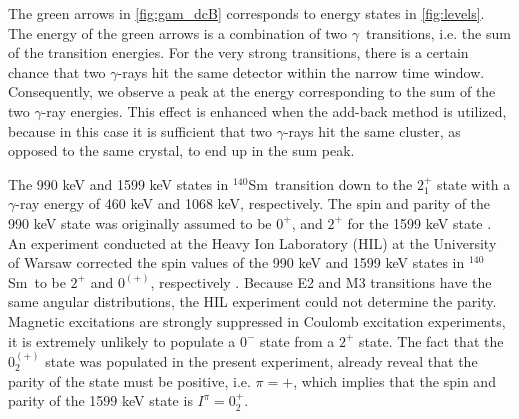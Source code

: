 \documentclass[twoside,english]{uiofysmaster/uiofysmaster}
\newcommand{\Sm}{$^{140}$Sm} %
\newcommand{\ga}{$\gamma$}
\let\orgautoref\autoref
\renewcommand{\autoref}
        {%
		 \def\sectionautorefname{Section}%
		 \def\subsectionautorefname{Section}%
		 \def\subsubsectionautorefname{Section}%
		 \def\chapterautorefname{Chapter}%
          \orgautoref}
\begin{document}
The green arrows in \autoref{fig:gam_dcB} corresponds to energy states in \autoref{fig:levels}. 
The energy of the green arrows is a combination of two \ga\ transitions, i.e. the sum of the transition energies.
For the very strong transitions, there is a certain chance that two \ga-rays hit the same detector within the narrow time window. 
Consequently, we observe a peak at the energy corresponding to the sum of the two \ga-ray energies.
This effect is enhanced when the add-back method is utilized, because in this case it is sufficient that two \ga-rays hit the same cluster, as opposed to the same crystal, to end up in the sum peak.

The 990 keV and 1599 keV states in \Sm\ transition down to the $2_1^+$ state with a \ga-ray energy of 460 keV  and 1068 keV, respectively.
The spin and parity of the 990 keV state was originally assumed to be $0^+$, and $2^+$ for the 1599 keV state  \cite{Firestone}.
An experiment conducted at the Heavy Ion Laboratory (HIL) at the University of Warsaw corrected the spin values of the 990 keV and 1599 keV states in \Sm\ to be $2^+$ and $0^{(+)}$, respectively \cite{Klintefjord2015, Samorajczyk2015}.
Because E2 and M3 transitions have the same angular distributions, the HIL experiment could not determine the parity. 
Magnetic excitations are strongly suppressed in Coulomb excitation experiments, it is extremely unlikely to populate a $0^-$ state from a $2^+$ state.
The fact that the $0_2^{(+)}$ state was populated in the present experiment, already reveal that the parity of the state must be positive, i.e. $\pi = +$, which implies that the spin and parity of the 1599 keV state is $I^\pi = 0_2^+$. 
\end{document}

